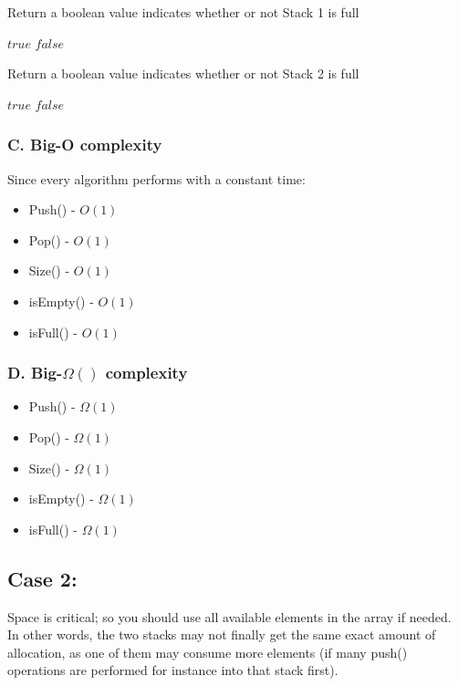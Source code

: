 \documentclass[16pt, letterpaper]{article}
\begin{document}
\begin{algorithm} [H]
\caption{Return a boolean value indicates whether or not Stack 1 is full}
\begin{algorithmic}
    \State \Return $\textit{true}$
    \Else
    \State \Return $\textit{false}$
    \EndIf
    \EndProcedure
\end{algorithmic}
\end{algorithm}

\begin{algorithm} [H]
\caption{Return a boolean value indicates whether or not Stack 2 is full}
\begin{algorithmic}
    \State \Return $\textit{true}$
    \Else
    \State \Return $\textit{false}$
    \EndIf
    \EndProcedure
\end{algorithmic}
\end{algorithm}

\subsubsection*{C. Big-O complexity}
Since every algorithm performs with a constant time: 
\begin{itemize}
    \item Push() - $O(1)$
    \item Pop() - $O(1)$
    \item Size() - $O(1)$
    \item isEmpty() - $O(1)$
    \item isFull() - $O(1)$
\end{itemize}

\subsubsection*{D. Big-$\Omega()$ complexity}
\begin{itemize}
    \item Push() - $\Omega(1)$
    \item Pop() - $\Omega(1)$
    \item Size() - $\Omega(1)$
    \item isEmpty() - $\Omega(1)$
    \item isFull() - $\Omega(1)$
\end{itemize}

\subsection{Case 2: }
Space is critical; so you should use all available elements in the array if needed. In other words, the two stacks may not finally get the same exact amount of allocation, as one of them may consume more elements (if many push() operations are performed for instance into that stack first).
\end{document}
